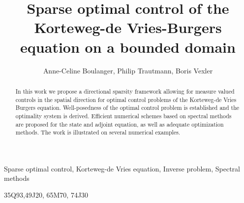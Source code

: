 \documentclass[final,leqno,onefignum,onetabnum]{siamltex1213}
\title{Sparse optimal control of the Korteweg-de Vries-Burgers equation on a bounded domain}
\author{Anne-Celine Boulanger, Philip Trautmann, Boris Vexler}
\begin{document}
\maketitle


\begin{abstract}
In this work we propose a directional sparsity framework allowing for measure valued controls in the spatial
direction for optimal control problems of the Korteweg-de Vries Burgers equation. Well-posedness of the optimal control
problem is established and the optimality system is derived. Efficient numerical schemes based on spectral methods are proposed for the state and adjoint equation, as well as adequate optimization methods. The work is illustrated on several numerical examples.
\end{abstract}

\begin{keywords}Sparse optimal control, Korteweg-de Vries equation, Inverse problem, Spectral methods\end{keywords}

\begin{AMS}35Q93,49J20, 65M70, 74J30\end{AMS}














\end{document}
